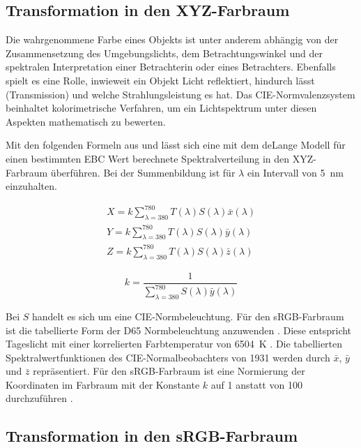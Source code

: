\documentclass[10pt,a4paper,DIV=12,parskip=half]{scrarticle}
\begin{document}
\subsection*{Transformation in den XYZ-Farbraum}

Die wahrgenommene Farbe eines Objekts ist unter anderem abhängig von der Zusammensetzung des Umgebungslichts, dem Betrachtungswinkel und der spektralen Interpretation einer Betrachterin oder eines Betrachters. Ebenfalls spielt es eine Rolle, inwieweit ein Objekt Licht reflektiert, hindurch lässt (Transmission) und welche Strahlungsleistung es hat. Das CIE-Normvalenzsystem beinhaltet kolorimetrische Verfahren, um ein Lichtspektrum unter diesen Aspekten mathematisch zu bewerten. \parencite{ASTM2022}

Mit den folgenden Formeln aus \cite{ASTM2022} und \cite{ASBC2011} lässt sich eine mit dem deLange Modell für einen bestimmten EBC Wert berechnete Spektralverteilung in den XYZ-Farbraum überführen. Bei der Summenbildung ist für $\lambda$ ein Intervall von 5~nm einzuhalten.

\begin{equation*}
	\begin{gathered}
		X = k \sum_{\lambda=380}^{780} T(\lambda) S(\lambda) \bar{x}(\lambda) \\
		Y = k \sum_{\lambda=380}^{780} T(\lambda) S(\lambda) \bar{y}(\lambda) \\
		Z = k \sum_{\lambda=380}^{780} T(\lambda) S(\lambda) \bar{z}(\lambda)
	\end{gathered}
\end{equation*}

\begin{equation*}
	k = \frac{1}{\sum_{\lambda=380}^{780} S(\lambda) \bar{y}(\lambda)}
\end{equation*}

Bei $S$ handelt es sich um eine CIE-Normbeleuchtung. Für den sRGB-Farbraum ist die tabellierte Form der D65 Normbeleuchtung anzuwenden \parencites{W3C2015}{CIE2022}. Diese entspricht Tageslicht mit einer korrelierten Farbtemperatur von 6504~K \parencite{ASTM2022}. Die tabellierten Spektralwertfunktionen des CIE-Normalbeobachters von 1931 \parencite{CIE2018} werden durch $\bar{x}$, $\bar{y}$ und $\bar{z}$ repräsentiert. Für den sRGB-Farbraum ist eine Normierung der Koordinaten im Farbraum mit der Konstante $k$ auf 1 anstatt von 100 durchzuführen \parencite{W3C2015}.

\subsection*{Transformation in den sRGB-Farbraum}
\end{document}
